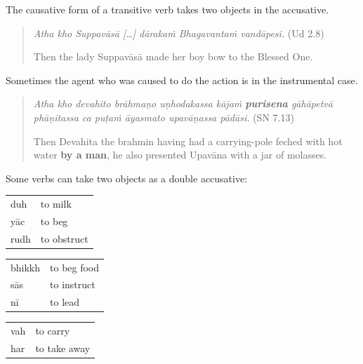 \documentclass[11pt,oneside]{memoir}
\begin{document}
The causative form of a transitive verb takes two objects in the accusative.

\begin{quote}
\emph{Atha kho Suppavāsā [\ldots{}] dārakaṁ Bhagavantaṁ vandāpesi.} (Ud 2.8)

Then the lady Suppavāsā made her boy bow to the Blessed One.
\end{quote}

Sometimes the agent who was caused to do the action is in the instrumental case.

\begin{quote}
\emph{Atha kho devahito brāhmaṇo uṇhodakassa kājaṁ \textbf{purisena} gāhāpetvā phāṇitassa ca puṭaṁ āyasmato upavāṇassa pādāsi.} (SN 7.13)

Then Devahita the brahmin having had a carrying-pole feched with hot water \textbf{by a man}, he also presented Upavāna with a jar of molasses.
\end{quote}

Some verbs can take two objects as a double accusative:

\begin{multicols}{3}

\begin{center}
\begin{tabular}{ll}
duh & to milk\\
yāc & to beg\\
rudh & to obstruct\\
\end{tabular}
\end{center}

\columnbreak

\begin{center}
\begin{tabular}{ll}
bhikkh & to beg food\\
sās & to instruct\\
nī & to lead\\
\end{tabular}
\end{center}

\columnbreak

\begin{center}
\begin{tabular}{ll}
vah & to carry\\
har & to take away\\
\end{tabular}
\end{center}

\end{multicols}
\end{document}
